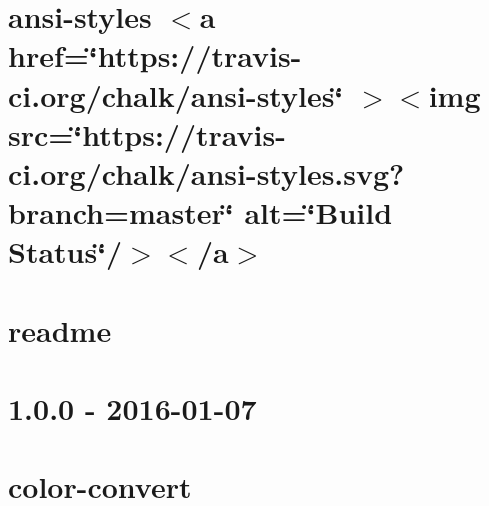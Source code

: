 \documentclass[twoside]{book}
\newcommand{\+}{\discretionary{\mbox{\scriptsize$\hookleftarrow$}}{}{}}
\begin{document}
\chapter{ansi-\/styles \texorpdfstring{$<$}{<}a href=\char`\"{}https\+://travis-\/ci.\+org/chalk/ansi-\/styles\char`\"{} \texorpdfstring{$>$}{>}\texorpdfstring{$<$}{<}img src=\char`\"{}https\+://travis-\/ci.\+org/chalk/ansi-\/styles.\+svg?branch=master\char`\"{} alt=\char`\"{}\+Build Status\char`\"{}/\texorpdfstring{$>$}{>}\texorpdfstring{$<$}{<}/a\texorpdfstring{$>$}{>}}
\label{md__c___users_vaishnavi_jadhav__desktop__developer_code_mean_stack_example_client_node_modules_o62e4628db5a2c57135f8247cbc5df520}

\chapter{readme}
\label{md__c___users_vaishnavi_jadhav__desktop__developer_code_mean_stack_example_client_node_modules_ora_node_modules_chalk_readme}

\chapter{1.0.0 -\/ 2016-\/01-\/07}
\label{md__c___users_vaishnavi_jadhav__desktop__developer_code_mean_stack_example_client_node_modules_oaca27bab40250aea96c1e5553eed1b05}

\chapter{color-\/convert}
\label{md__c___users_vaishnavi_jadhav__desktop__developer_code_mean_stack_example_client_node_modules_oad3cd5040a7fc795ab52b52ee72e6abf}

\end{document}
